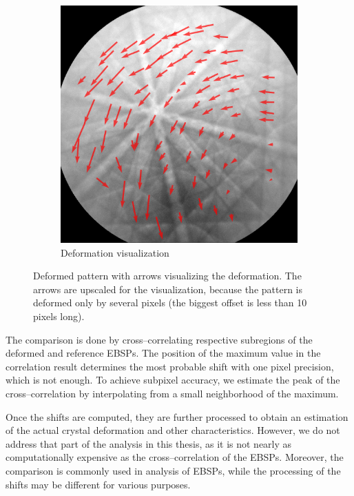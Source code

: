 \begin{figure}
\begin{subfigure}{.4\textwidth}
	\end{subfigure}
	\centering
	\begin{subfigure}{.4\textwidth}
		\centering
		\includegraphics[width=.9\linewidth]{img/roi_shifts}
		\caption{Deformation visualization}
		\label{roi-shifts:result}
	\end{subfigure}

	\caption{Deformed pattern with arrows visualizing the deformation. The arrows are upscaled for the visualization, because the pattern is deformed only by several pixels (the biggest offset is less than 10 pixels long).}
	\label{roi-shifts}
\end{figure}

The comparison is done by cross--correlating respective subregions of the deformed and reference EBSPs. The position of the maximum value in the correlation result determines the most probable shift with one pixel precision, which is not enough. To achieve subpixel accuracy, we estimate the peak of the cross--correlation by interpolating from a small neighborhood of the maximum.

Once the shifts are computed, they are further processed to obtain an estimation of the actual crystal deformation and other characteristics. However, we do not address that part of the analysis in this thesis, as it is not nearly as computationally expensive as the cross--correlation of the EBSPs. Moreover, the comparison is commonly used in analysis of EBSPs, while the processing of the shifts may be different for various purposes.

